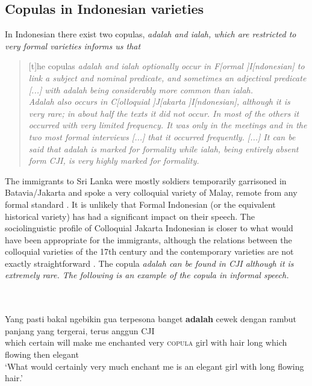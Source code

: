 \documentclass[a4paper,12pt]{article}
\newcommand{\xbox}[2]{\noindent\parbox[t]{#1}{#2}\noindent}
\newcommand{\ea}{\\\\}
\newcommand{\z}{\\\\}
\begin{document}
\subsection{Copulas in Indonesian varieties}\label{sec:copulaCJI}
In Indonesian there exist two copulas, \em adalah \em and \em ialah\em, which are restricted to very formal varieties
 \citet[98f]{Sneddon2006CJI} informs us that

\begin{quote}
[t]he copulas \em adalah \em and \em ialah \em optionally occur in F[ormal ]I[ndonesian] to link a subject and nominal predicate, and sometimes an adjectival predicate [...] with \em adalah \em being considerably more common than \em ialah.\em\\
\em Adalah \em also occurs in C[olloquial ]J[akarta ]I[ndonesian], although it is very rare; in about half the texts it did not occur. In most of the others it occurred with very limited frequency. It was only in the meetings and in the two most formal interviews [...] that it occurred frequently. [...] It can be said that \em adalah \em is marked for formality while \em ialah, \em being entirely absent form CJI, is very highly marked for formality.
\end{quote}

The immigrants to Sri Lanka were mostly soldiers temporarily garrisoned in Batavia/Jakarta and spoke a very colloquial variety of Malay, remote from any formal standard \citep{Adelaar1991,SmithEtAl2004,Nordhoff2009phd}. It is unlikely that Formal Indonesian (or the equivalent historical variety) has had a significant impact on their speech. The sociolinguistic profile of Colloquial Jakarta Indonesian is closer to what would have been appropriate for the immigrants, although the relations between the colloquial varieties of the 17th century and the contemporary varieties are not exactly straightforward \citep{Grijns1991, AdelaarEtAl1996}. The copula \em adalah \em can be found in CJI although it is extremely rare. The following is an example of the copula in informal speech.

 

\xbox{\textwidth}{
\ea\label{ex:indonesian:adalah}
\gll Yang pasti bakal ngebikin gua terpesona banget \textbf{adalah} cewek dengan rambut panjang yang tergerai, terus anggun \textsc{CJI} \\
      which certain will make me enchanted very \textsc{copula} girl with hair long which flowing then elegant \\
    `What would certainly very much enchant me is an elegant girl with long flowing hair.' \citep[79]{Sneddon2006CJI}
\z
}
\end{document}
